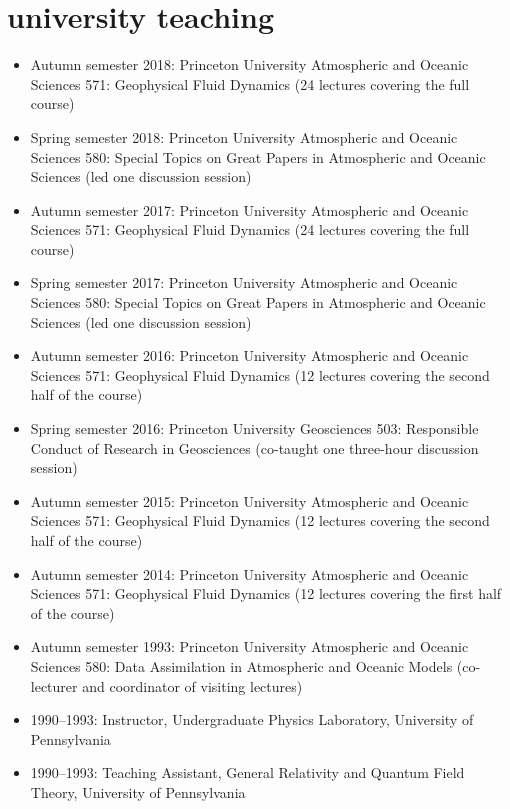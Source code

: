 \documentclass{article}
\begin{document}
\section*{\sc  \color{Maroon}  university teaching}
\vspace{-.3cm}

\begin{itemize}[leftmargin=*]

\item Autumn semester 2018: Princeton University Atmospheric and Oceanic Sciences 571: Geophysical Fluid Dynamics (24 lectures covering the full course)
    
\item Spring semester 2018: Princeton University Atmospheric and Oceanic Sciences 580: Special Topics on Great Papers in Atmospheric and Oceanic Sciences (led one discussion session)

\item Autumn semester 2017: Princeton University Atmospheric and Oceanic Sciences 571: Geophysical Fluid Dynamics (24 lectures covering the full course)
  
\item Spring semester 2017: Princeton University Atmospheric and Oceanic Sciences 580: Special Topics on Great Papers in Atmospheric and Oceanic Sciences (led one discussion session)

\item Autumn semester 2016: Princeton University Atmospheric and Oceanic Sciences 571: Geophysical Fluid Dynamics (12 lectures covering the second half of the course)

\item Spring semester 2016: Princeton University Geosciences 503:
  Responsible Conduct of Research in Geosciences (co-taught one
  three-hour discussion session)

\item Autumn semester 2015: Princeton University Atmospheric and Oceanic Sciences 571: Geophysical
  Fluid Dynamics (12 lectures covering  the second half of the course)

\item Autumn semester 2014: Princeton University Atmospheric and Oceanic Sciences 571: Geophysical
  Fluid Dynamics (12 lectures covering  the first half of the course)

\item Autumn semester 1993: Princeton University Atmospheric and Oceanic Sciences 580: Data
  Assimilation in Atmospheric and Oceanic Models (co-lecturer and
  coordinator of visiting lectures)

\item 1990--1993:  Instructor, Undergraduate Physics Laboratory,
  University of Pennsylvania 

\item 1990--1993:  Teaching Assistant,  General Relativity and
  Quantum Field Theory, University of Pennsylvania 

\end{itemize}
\end{document}

